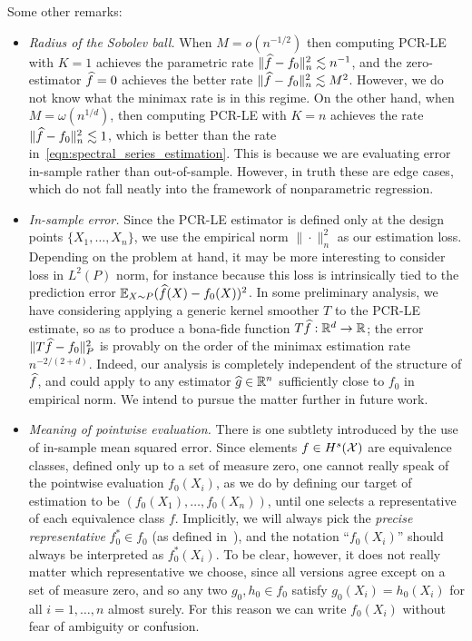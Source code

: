 Some other remarks:
\begin{itemize}
	\item \emph{Radius of the Sobolev ball.} 
	When $M = o(n^{-1/2})$ then computing PCR-LE with $K = 1$ achieves the parametric rate $\|\widehat{f} - f_0\|_n^2 \lesssim n^{-1}$, and the zero-estimator $\widehat{f} = 0$ achieves the better rate $\|\widehat{f} - f_0\|_n^2 \lesssim M^2$. However, we do not know what the minimax rate is in this regime. On the other hand, when $M = \omega(n^{1/d})$, then computing PCR-LE with $K = n$ achieves the rate $\|\widehat{f} - f_0\|_n^2 \lesssim 1$, which is better than the rate in~\eqref{eqn:spectral_series_estimation}. This is because we are evaluating error in-sample rather than out-of-sample. However, in truth these are edge cases, which do not fall neatly into the framework of nonparametric regression. 
	
	\item \emph{In-sample error.} Since the PCR-LE estimator is defined only at the design points $\{X_1,\ldots,X_n\}$, we use the empirical norm $\|\cdot\|_n^2$ as our estimation loss. Depending on the problem at hand, it may be more interesting to consider loss in $L^2(P)$ norm, for instance because this loss is intrinsically tied to the prediction error $\mathbb{E}_{X \sim P}(\widehat{f}(X) - f_0(X))^2$. In some preliminary analysis, we have considering applying a generic kernel smoother $T$ to the PCR-LE estimate, so as to produce a bona-fide function $T\widehat{f}: \mathbb{R}^d \to \mathbb{R}$; the error $\|T\widehat{f} - f_0\|_P^2$ is provably on the order of the minimax estimation rate $n^{-2/(2 + d)}$. Indeed, our analysis is completely independent of the structure of $\widehat{f}$, and could apply to any estimator $\widehat{g} \in \mathbb{R}^n$ sufficiently close to $f_0$ in empirical norm. We intend to pursue the matter further in future work.
	
	\item \emph{Meaning of pointwise evaluation.} There is one subtlety introduced by the use of in-sample mean squared error. Since elements $f \in H^s(\mathcal{X})$ are equivalence classes, defined only up to a set of measure zero, one cannot really speak of the pointwise evaluation $f_0(X_i)$, as we do by defining our target of estimation to be $(f_0(X_1),\ldots,f_0(X_n))$, until one selects a representative of each equivalence class $f$. Implicitly, we will always pick the \emph{precise representative} $f_0^{\ast} \in f_0$ (as defined in~\cite{evans15}), and the notation ``$f_0(X_i)$'' should always be interpreted as $f_0^{\ast}(X_i)$. To be clear, however, it does not really matter which representative we choose, since all versions agree except on a set of measure zero, and so any two $g_0,h_0 \in f_0$ satisfy $g_0(X_i) = h_0(X_i)$ for all $i = 1,\ldots,n$ almost surely. For this reason we can write $f_0(X_i)$ without fear of ambiguity or confusion. 
	

\end{itemize}

